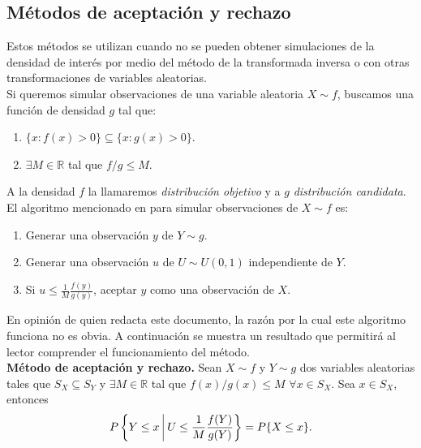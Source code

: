 \documentclass[11pt,a4paper]{article}
\begin{document}
\subsection{Métodos de aceptación y rechazo}
\label{aceptacion}

Estos métodos se utilizan cuando no se pueden obtener simulaciones de la densidad de interés por medio del método de la transformada inversa o con otras transformaciones de variables aleatorias.\\

Si queremos simular observaciones de una variable aleatoria $X\sim f$, buscamos una función de densidad $g$ tal que:

\begin{enumerate}
\item $\{x: f(x) > 0\}\subseteq \{x: g(x) > 0\}$.\\
\item $\exists M \in \mathbb{R}$ tal que $f/g \leq M.$
\end{enumerate}

A la densidad $f$ la llamaremos \textit{distribución objetivo} y a $g$ \textit{distribución candidata}. El algoritmo mencionado en \citet{casella} para simular observaciones de $X \sim f$ es:

\begin{enumerate}
\item Generar una observación $y$ de $Y\sim g$.
\item Generar una observación $u$ de $U\sim U(0,1)$ independiente de $Y$.
\item Si $u \leq \frac{1}{M}\frac{f(y)}{g(y)}$, aceptar $y$ como una observación de $X$.\\
\end{enumerate}

En opinión de quien redacta este documento, la razón por la cual este algoritmo funciona no es obvia. A continuación se muestra un resultado que permitirá al lector comprender el funcionamiento del método.\\

\textbf{Método de aceptación y rechazo.} Sean $X\sim f$ y $Y \sim g$ dos variables aleatorias tales que $S_X \subseteq S_Y$ y $\exists M \in \mathbb{R}$ tal que $f(x)/g(x) \leq M$ $\forall x \in S_X$. Sea $x \in S_X$, entonces $$P\left\lbrace Y \leq x \  \vline \ U\leq \frac{1}{M}\frac{f(Y)}{g(Y)}\right\rbrace = P\{X\leq x\}.$$\\
\end{document}
